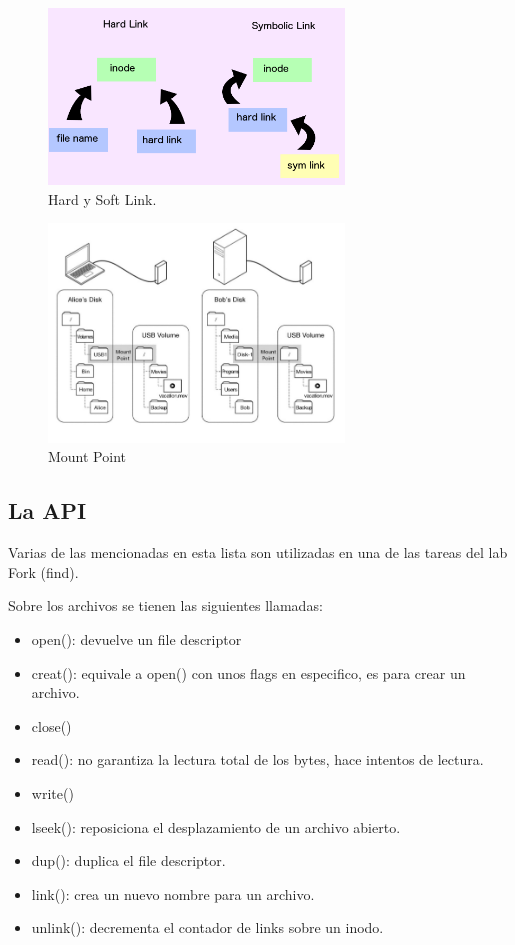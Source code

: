 \documentclass[titlepage,a4paper]{article}
\begin{document}
    \begin{figure}[!htb]
    \centering
    \includegraphics[width=0.7\textwidth]{ImagenesApunte/HardSoftLink.png}
    \caption{Hard y Soft Link.}
    \end{figure}
    
    \begin{figure}[!htb]
    \centering
    \includegraphics[width=0.7\textwidth]{ImagenesApunte/mount_point.jpg}
    \caption{Mount Point}
    \end{figure}

    \newpage


\subsection*{La API}
Varias de las mencionadas en esta lista son utilizadas en una de las tareas del lab Fork (find).

Sobre los archivos se tienen las siguientes llamadas:
\begin{itemize}
    \item open(): devuelve un file descriptor
    \item creat(): equivale a open() con unos flags en especifico, es para crear un archivo.
    \item close()
    \item read(): no garantiza la lectura total de los bytes, hace intentos de lectura.
    \item write()
    \item lseek(): reposiciona el desplazamiento de un archivo abierto.
    \item dup(): duplica el file descriptor.
    \item link(): crea un nuevo nombre para un archivo.
    \item unlink(): decrementa el contador de links sobre un inodo.
\end{itemize}
\end{document}
